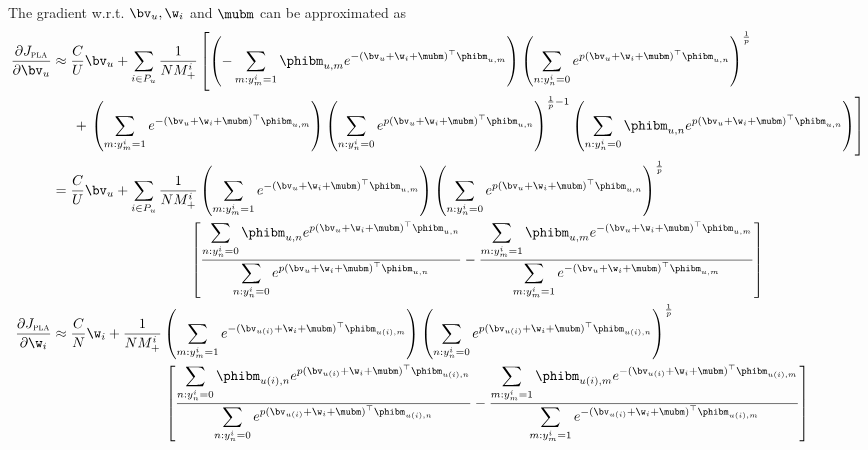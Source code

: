 The gradient w.r.t. $\bv_u, \w_i$ and $\mubm$ can be approximated as 
\begin{equation*}
\begin{aligned}
\frac{\partial J_\textsc{pla}}{\partial \bv_u}
&\approx \frac{C}{U} \bv_u
  + \sum_{i \in P_u} \frac{1}{N M_+^i} \left[
    \left(-\sum_{m: y_m^i = 1} \phibm_{u,m} e^{-(\bv_u + \w_i + \mubm)^\top \phibm_{u,m}} \right)
    \left( \sum_{n: y_n^i = 0} e^{p (\bv_u + \w_i + \mubm)^\top \phibm_{u,n}} \right)^\frac{1}{p} \right. \\
& \hspace{1.5em} + \left.
    \left( \sum_{m: y_m^i = 1} e^{-(\bv_u + \w_i + \mubm)^\top \phibm_{u,m}} \right)
    \left( \sum_{n: y_n^i = 0} e^{p (\bv_u + \w_i + \mubm)^\top \phibm_{u,n}} \right)^{\frac{1}{p} - 1}
    \left( \sum_{n: y_n^i = 0} \phibm_{u,n} e^{p (\bv_u + \w_i + \mubm)^\top \phibm_{u,n}} \right) \right] \\
&= \frac{C}{U} \bv_u
  + \sum_{i \in P_u} \frac{1}{N M_+^i} 
    \left( \sum_{m: y_m^i = 1} e^{-(\bv_u + \w_i + \mubm)^\top \phibm_{u,m}} \right)
    \left( \sum_{n: y_n^i = 0} e^{p (\bv_u + \w_i + \mubm)^\top \phibm_{u,n}} \right)^\frac{1}{p} \\
& \hspace{9.8em} \left[ 
    \frac{ \displaystyle \sum_{n: y_n^i = 0} \phibm_{u,n} e^{p (\bv_u + \w_i + \mubm)^\top \phibm_{u,n}} }
         { \displaystyle \sum_{n: y_n^i = 0} e^{p (\bv_u + \w_i + \mubm)^\top \phibm_{u,n}} }
    - \frac{ \displaystyle \sum_{m: y_m^i = 1} \phibm_{u,m} e^{-(\bv_u + \w_i + \mubm)^\top \phibm_{u,m}} }
           { \displaystyle \sum_{m: y_m^i = 1} e^{-(\bv_u + \w_i + \mubm)^\top \phibm_{u,m}} } \right] \\
%
\frac{\partial J_\textsc{pla}}{\partial \w_i}
&\approx \frac{C}{N} \w_i
  + \frac{1}{N M_+^i} 
    \left( \sum_{m: y_m^i = 1} e^{-(\bv_{u(i)} + \w_i + \mubm)^\top \phibm_{u(i),m}} \right)
    \left( \sum_{n: y_n^i = 0} e^{p (\bv_{u(i)} + \w_i + \mubm)^\top \phibm_{u(i),n}} \right)^\frac{1}{p} \\
& \hspace{8em} \left[ 
    \frac{ \displaystyle \sum_{n: y_n^i = 0} \phibm_{u(i),n} e^{p (\bv_{u(i)} + \w_i + \mubm)^\top \phibm_{u(i),n}} }
         { \displaystyle \sum_{n: y_n^i = 0} e^{p (\bv_{u(i)} + \w_i + \mubm)^\top \phibm_{u(i),n}} }
    - \frac{ \displaystyle \sum_{m: y_m^i = 1} \phibm_{u(i),m} e^{-(\bv_{u(i)} + \w_i + \mubm)^\top \phibm_{u(i),m}} }
           { \displaystyle \sum_{m: y_m^i = 1} e^{-(\bv_{u(i)} + \w_i + \mubm)^\top \phibm_{u(i),m}} } \right] \\

\end{aligned}
\end{equation*}
